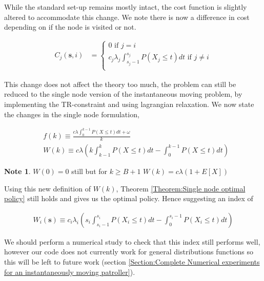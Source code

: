 \documentclass[a4paper,10pt]{article}
\theoremstyle{definition}
\theoremstyle{definition}
\theoremstyle{remark}
\theoremstyle{definition}
\newtheorem*{note}{Note}
\begin{document}
While the standard set-up remains mostly intact, the cost function is slightly altered to accommodate this change. We note there is now a difference in cost depending on if the node is visited or not.

\begin{align*}
C_{j}(\bm{s},i) &= \begin{cases}
0  \text{ if } j=i \\
c_{j} \lambda_{j} \int_{s_{j}-1}^{s_{j}} P(X_{j} \leq t) dt \text{ if } j \neq i \\
\end{cases}
\end{align*}

This change does not affect the theory too much, the problem can still be reduced to the single node version of the instantaneous moving problem, by implementing the TR-constraint and using lagrangian relaxation. We now state the changes in the single node formulation,

\begin{align*}
&f(k) \equiv \frac{c \lambda \int_{0}^{k-1} P(X \leq t) dt + \omega}{k} \\
&W(k) \equiv c \lambda \left( k \int_{k-1}^{k} P(X \leq t) dt - \int_{0}^{k-1} P(X \leq t) dt \right)
\end{align*}

\begin{note}
$W(0)=0$ still but for $k \geq B+1$ $W(k)= c \lambda (1+E[X])$
\end{note}

Using this new definition of $W(k)$, Theorem \ref{Theorem:Single node optimal policy} still holds and gives us the optimal policy. Hence suggesting an index of

\begin{align*}
W_{i}(\bm{s}) \equiv c_{i} \lambda_{i} \left( s_{i} \int_{s_{i}-1}^{s_{i}} P(X_{i} \leq t) dt - \int_{0}^{s_{i}-1} P(X_{i} \leq t) dt \right)
\end{align*}

We should perform a numerical study to check that this index still performs well, however our code does not currently work for general distributions functions so this will be left to future work (section \ref{Section:Complete Numerical experiments for an instantaneously moving patroller}).
\end{document}
